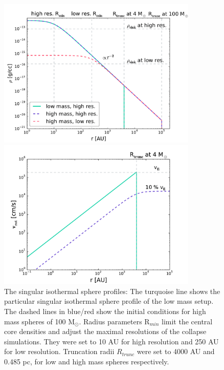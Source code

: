 \begin{figure}[!htb]
 \centering
 \includegraphics[width=0.85\textwidth]{Figures/new_nsis}
 \captionsetup{justification=justified,singlelinecheck=false,width=\linewidth}
 \decoRule
 \caption[Singular isothermal sphere profile]{The singular isothermal sphere profiles: The turquoise line shows the particular singular isothermal sphere profile of the low mass setup.
                                              The dashed lines in blue/red show the initial conditions for high mass spheres of 100 M$_{\odot}$.
                                              Radius parameters R$_{min}$ limit the central core densities and adjust the maximal resolutions of the collapse simulations.
                                              They were set to 10 AU for high resolution and 250 AU for low resolution.
                                              Truncation radii $R_{trunc}$ were set to 4000 AU and 0.485 pc, for low and high mass spheres respectively.}
\label{fig:nsis}
\includegraphics[width=0.85\textwidth]{Figures/solid_rot}

\end{figure}
